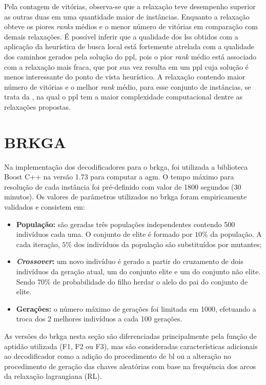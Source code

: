 Pela contagem  de vitórias,  observa-se que a  relaxação {\rlq}  teve desempenho
superior  as outras  duas  em uma  quantidade maior  de  instâncias. Enquanto  a
relaxação {\rlu}  obteve os  piores \textit{ranks}  médios e  o menor  número de
vitórias em comparação com demais relaxações. É possível inferir que a qualidade
dos  \gls{ls}s  obtidos com  a  aplicação  da  heurística  de busca  local  está
fortemente  atrelada  com a  qualidade  dos  caminhos  gerados pela  solução  do
\gls{ppl}, pois o  pior \textit{rank} médio está associado com  a relaxação mais
fraca, que por sua vez resulta em um \gls{ppl} cuja solução é menos interessante
do ponto de vista heurístico. A relaxação  contendo maior número de vitórias e o
melhor  \textit{rank} médio,  para  esse  conjunto de  instâncias,  se trata  da
{\rlq}, na  qual o \gls{ppl}  tem a  maior complexidade computacional  dentre as
relaxações propostas.

\section{BRKGA}

Na  implementação  dos  decodificadores  para o  \gls{brkga},  foi  utilizada  a
biblioteca Boost  C++ na versão 1.73  para computar a \gls{agm}.  O tempo máximo
para resolução de cada instância foi pré-definido com valor de 1800 segundos (30
minutos). Os valores de parâmetros utilizados no \gls{brkga} foram empiricamente
validados e consistem em:

\begin{itemize}
\item \textbf{População:} são geradas três populações independentes contendo 500
indivíduos cada uma.  O conjunto de elite  é formado por $10\%$  da população. A
cada iteração, $5\%$ dos indivíduos da população são substituídos por mutantes;
\item  \textbf{\textit{Crossover}:}  um novo  indivíduo  é  gerado a  partir  do
cruzamento de  dois indivíduos da  geração atual, um do  conjunto elite e  um do
conjunto não elite. Sendo 70$\%$ de probabilidade do filho herdar o alelo do pai
do conjunto de elite.
\item  \textbf{Gerações:} o  número máximo  de  gerações foi  limitada em  1000,
efetuando a troca dos 2 melhores indivíduos a cada 100 gerações.
\end{itemize}

As  versões do  \gls{brkga} nesta  seção são  diferenciadas principalmente  pela
função de aptidão utilizada (F1, F2 ou F3), mas são consideradas características
adicionais  ao decodificador  como a  adição do  procedimento de  \gls{bl} ou  a
alteração  no  procedimento  de  geração  das  chaves  aleatórias  com  base  na
frequência dos arcos da relaxação lagrangiana (RL).

